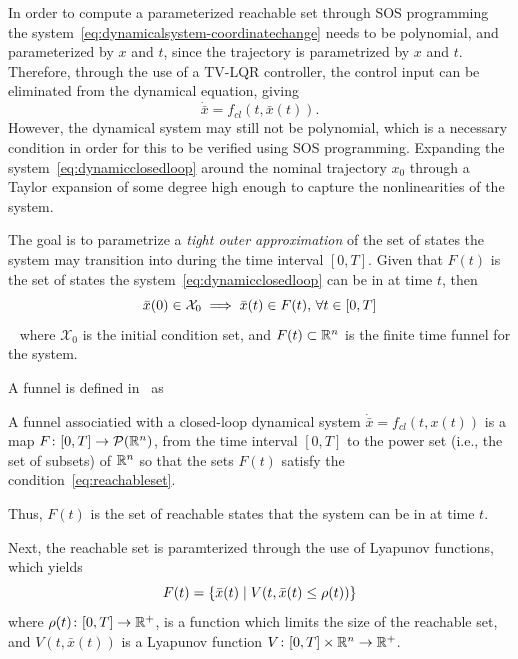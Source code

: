 In order to compute a parameterized reachable set through \ac{SOS} programming
the system~\cref{eq:dynamicalsystem-coordinatechange} needs to be polynomial,
and parameterized by \(x\) and \(t\), since the trajectory is parametrized by
\(x\) and \(t\). Therefore, through the use of a \ac{TV-LQR} controller, the
control input can be eliminated from the dynamical equation, giving
\begin{equation}
  \label{eq:dynamicclosedloop}
  \dot{\bar{x}} = f_{cl}(t,\bar{x}(t)).
\end{equation}
However, the dynamical system may still not be polynomial, which is a necessary
condition in order for this to be verified using \ac{SOS} programming. Expanding
the system~\cref{eq:dynamicclosedloop} around the nominal trajectory \(x_0\)
through a Taylor expansion of some degree high enough to capture the
nonlinearities of the system.

The goal is to parametrize a \textit{tight outer approximation} of the set of
states the system may transition into during the time interval \([0,T]\). Given
that \(F(t)\) is the set of states the system~\cref{eq:dynamicclosedloop} can be
in at time \(t\), then
\begin{equation}
  \label{eq:reachableset}
  \bar{x}(0) \in \mathcal{X}_0 \implies \bar{x}(t) \in F(t), \, \forall t \in [0,T]
\end{equation}~\cite{majumdarFunnelLibrariesRealtime2017} 
where \(\mathcal{X}_0\) is the initial condition set, and \(F(t) \subset \mathbb{R}^n\)
is the finite time funnel for the system.

A funnel is defined in~\cite[Majumdar]{majumdarFunnelLibrariesRealtime2017} as
\begin{definition}
  \label{def:funnel}
  A funnel associatied with a closed-loop dynamical system \(\dot{\bar{x}} =
  f_{cl}(t,x(t))\) is a map \(F \colon [0,T] \rightarrow \mathcal{P}(\mathbb{R}^n)\),
  from the time interval \([0,T]\) to the power set (i.e., the set of subsets)
  of \(\mathbb{R}^n\) so that the sets \(F(t)\) satisfy the
  condition~\cref{eq:reachableset}.
\end{definition}
Thus, \(F(t)\) is the set of reachable states that the system can be in at time
\(t\).

Next, the reachable set is paramterized through the use of Lyapunov functions,
which yields
\begin{equation}
  F(t) = \lbrace\bar{x}(t) \mid V(t, \bar{x}(t) \leq \rho (t))\rbrace
\end{equation}
where \(\rho (t) \colon [0,T] \rightarrow \mathbb{R}^+\), is a function which limits the
size of the reachable set, and \(V(t,\bar{x}(t))\) is a Lyapunov function \(V
\colon [0,T] \times \mathbb{R}^n \rightarrow \mathbb{R}^+\).

